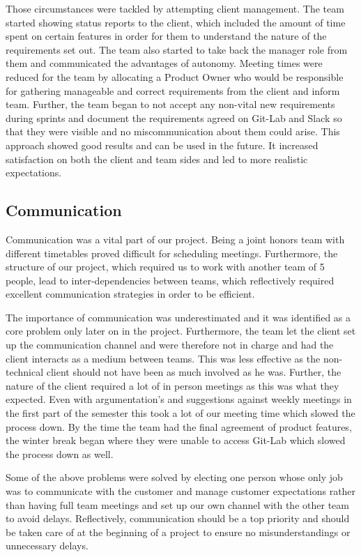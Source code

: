 \documentclass{l3proj}
\begin{document}
  Those circumstances were tackled by attempting client management. The team started showing status reports to the client, which included the amount of time spent on certain features in order for them to understand the nature of the requirements set out. The team also started to take back the manager role from them and communicated the advantages of autonomy. Meeting times were reduced for the team by allocating a Product Owner who would be responsible for gathering manageable and correct requirements from the client and inform team. Further, the team began to not accept any non-vital new requirements during sprints and document the requirements agreed on Git-Lab and Slack so that they were visible and no miscommunication about them could arise. This approach showed good results and can be used in the future. It increased satisfaction on both the client and team sides and led to more realistic expectations.

\subsection{Communication}
Communication was a vital part of our project. Being a joint honors team with different timetables proved difficult for scheduling meetings. Furthermore, the structure of our project, which required us to work with another team of 5 people, lead to inter-dependencies between teams, which reflectively required excellent communication strategies in order to be efficient.  

The importance of communication was underestimated and it was identified as a core problem only later on in the project. Furthermore, the team let the client set up the communication channel and were therefore not in charge and had the client interacts as a medium between teams. This was less effective as the non-technical client should not have been as much involved as he was. Further, the nature of the client required a lot of in person meetings as this was what they expected. Even with argumentation's and suggestions against weekly meetings in the first part of the semester this took a lot of our meeting time which slowed the process down. By the time the team had the final agreement of product features, the winter break began where they were unable to access Git-Lab which slowed the process down as well.

Some of the above problems were solved by electing one person whose only job was to communicate with the customer and manage customer expectations rather than having full team meetings and set up our own channel with the other team to avoid delays. Reflectively, communication should be a top priority and should be taken care of at the beginning of a project to ensure no misunderstandings or unnecessary delays.
\end{document}
